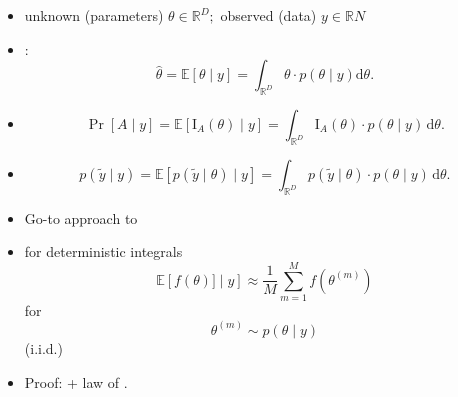 \documentclass[9pt]{report}
\newcommand{\expect}[1]{\mathbb{E}\!\left[ #1 \right]}
\newcommand{\reals}{\mathbb{R}}
\newcommand{\draw}[2]{#1^{(#2)}}
\begin{document}
\sld{}
\vfill
\begin{center}
\Huge {}
\end{center}
\vfill
\vfill

\begin{itemize}
\item unknown (parameters) $\theta \in \reals^D;$ \quad 
  observed (data) $y \in \reals{N}$
\item {}: 
$$
\widehat{\theta}
= \expect{\theta \mid y}
= \int_{\reals^D} \theta \cdot p(\theta \mid y) \textrm{d}\theta. 
$$
\item {}
$$
\Pr[A \mid y]
= \expect{\textrm{I}_{A}(\theta) \mid y}
= \int_{\reals^D} \textrm{I}_{A}(\theta) \cdot p(\theta \mid y) \, \textrm{d}\theta. 
$$
\item {}
$$
p(\tilde{y} \mid y) 
= \expect{p(\tilde y \mid \theta) \mid y}
= \int_{\mathbb{R}^D} p(\tilde{y} \mid \theta) \cdot p(\theta \mid 
  y) \, \textrm{d}\theta. 
$$
\end{itemize}

\begin{itemize}
\item Go-to approach to 
\item {} for deterministic integrals 
$$
\expect{f(\theta)] \mid y}
\approx \frac{1}{M} \sum_{m = 1}^M f\!\left(\draw{\theta}{m}\right) 
$$
for 
$$
\draw{\theta}{m} \sim p(\theta \mid y) 
$$
 (i.i.d.) 
\item Proof: 
  + law of . 
\end{itemize}
\end{document}
